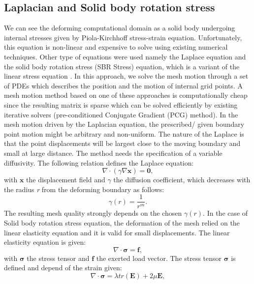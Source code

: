 \documentclass[10pt,a4paper,twoside]{article}
\begin{document}
\subsection{Laplacian and Solid body rotation stress}
We can see the deforming computational domain as a solid body undergoing internal stresses given by Piola-Kirchhoff stress-strain equation. Unfortunately, this equation is non-linear and expensive to solve using existing numerical techniques. Other type of equations were used namely the
Laplace equation and the solid body rotation stress (SBR Stress) equation, which is a variant of the linear stress equation \cite{bos2010numerical}.
In this approach, we solve the mesh motion through a set of PDEs which describes the position and the motion of internal grid points. A mesh motion method based on one of these approaches is computationally cheap since the resulting matrix is sparse which can be solved efficiently by existing iterative solvers (pre-conditioned Conjugate Gradient (PCG) method). In the mesh motion driven by the Laplacian equation, the prescribed/ given boundary point motion might be arbitrary and non-uniform. The nature of the Laplace is that the point displacements will be largest close to the moving boundary and small at large distance. The method needs the specification of a variable diffusivity. The following relation defines the Laplace equation:
\begin{equation}
\nabla \cdot (\gamma \nabla \boldsymbol{x}) = \boldsymbol{0},
\end{equation}
with $\boldsymbol{x}$ the displacement field and $\gamma$ the diffusion coefficient, which decreases with the radius \textit{r} from the deforming boundary as follows:
\begin{equation}
\gamma (\textit{r}) = \frac{1}{\textit{r}^m}.
\end{equation}
The resulting mesh quality strongly depends on the chosen $\gamma (\textit{r}).$
In the case of Solid body rotation stress equation, the deformation of the mesh relied on the linear elasticity equation and it is valid for small displacements. The linear elasticity equation is given:
\begin{equation}
\nabla \cdot \boldsymbol{\sigma} = \boldsymbol{f},
\end{equation}
with $\boldsymbol{\sigma}$ the stress tensor and $\boldsymbol{f}$ the exerted load vector. The stress tensor $\boldsymbol{\sigma}$ is defined and depend of the strain given:
\begin{equation}
\nabla \cdot \boldsymbol{\sigma} = \lambda tr(\boldsymbol{E}) + 2\mu \boldsymbol{E},
\end{equation}
\end{document}
